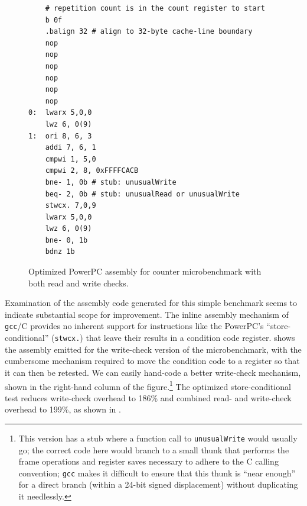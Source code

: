 \begin{figure}
\sis\fontsize{9}{10}\begin{verbatim}
    # repetition count is in the count register to start
    b 0f
    .balign 32 # align to 32-byte cache-line boundary
    nop
    nop
    nop
    nop
    nop
    nop
0:  lwarx 5,0,0
    lwz 6, 0(9)
1:  ori 8, 6, 3
    addi 7, 6, 1
    cmpwi 1, 5,0
    cmpwi 2, 8, 0xFFFFCACB
    bne- 1, 0b # stub: unusualWrite
    beq- 2, 0b # stub: unusualRead or unusualWrite
    stwcx. 7,0,9
    lwarx 5,0,0
    lwz 6, 0(9)
    bne- 0, 1b
    bdnz 1b
\end{verbatim}
\caption{Optimized PowerPC assembly for counter microbenchmark with both read
  and write checks.}
\label{fig:rw-assem}
\end{figure}
Examination of the assembly code generated for this simple benchmark
seems to indicate substantial scope for improvement.  The inline
assembly mechanism of \texttt{gcc}/C provides no inherent support for
instructions 
like the PowerPC's ``store-conditional'' (\texttt{stwcx.}) that leave
their results in a condition code register.  
shows the assembly emitted for the write-check version of the
microbenchmark, with the cumbersome mechanism required to move the
condition code to a register so that it can then be retested.  We can
easily hand-code a better write-check mechanism, shown in the
right-hand column of the figure.\footnote{This version has a stub where a
function call to \texttt{unusualWrite} would usually go; the correct
code here would branch to a small thunk that performs the
frame operations and register saves necessary to adhere to the C
calling convention; \texttt{gcc} makes it difficult to ensure that
this thunk is ``near enough'' for a direct branch (within a 24-bit
signed displacement) without duplicating it needlessly.}
The optimized store-conditional test reduces write-check overhead to
186\% and combined read- and write-check overhead to 199\%, as shown
in .

